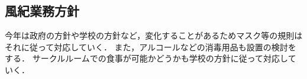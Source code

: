 \subsection*{風紀業務方針}


今年は政府の方針や学校の方針など，変化することがあるためマスク等の規則はそれに従って対応していく．
また，アルコールなどの消毒用品も設置の検討をする．
サークルルームでの食事が可能かどうかも学校の方針に従って対応していく．
